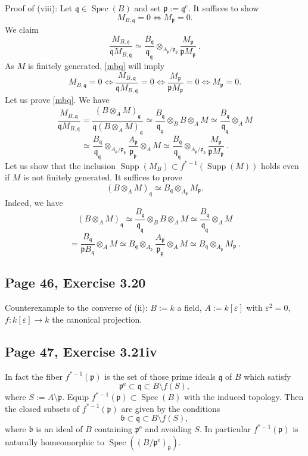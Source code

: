 \documentclass[parskip=half,fontsize=12pt]{scrartcl}%
\newcommand{\oo}{\operatorname}\newcommand{\ooo}{\operatorname*}
\newcommand{\mf}{\mathfrak}
\newcommand{\bbb}{\mf b}
\newcommand{\ppp}{\mf p}
\newcommand{\qqq}{\mf q}
\newcommand{\Spec}{\operatorname{Spec}}\newcommand{\Sp}{\operatorname{Spec}}
\begin{document}
Proof of (viii): Let $\qqq\in\Spec(B)$ and set $\ppp:=\qqq^{\oo c}$. It suffices to show 
$$
M_{B,\qqq}=0\iff M_\ppp=0.
$$ 
We claim
\begin{equation}\label{mbq}
\frac{M_{B,\qqq}}{\qqq M_{B,\qqq}}\simeq\frac{B_\qqq}{\qqq_\qqq}\otimes_{A_\ppp/\ppp_\ppp}\frac{M_\ppp}{\ppp M_\ppp}\ .
\end{equation}
As $M$ is finitely generated, \eqref{mbq} will imply 
$$
M_{B,\qqq}=0\iff\frac{M_{B,\qqq}}{\qqq M_{B,\qqq}}=0\iff\frac{M_\ppp}{\ppp M_\ppp}=0\iff M_\ppp=0.
$$ 
Let us prove \eqref{mbq}. We have 
$$
\frac{M_{B,\qqq}}{\qqq M_{B,\qqq}}=
\frac{(B\otimes_AM)_\qqq}{\qqq(B\otimes_AM)_\qqq}\simeq
\frac{B_\qqq}{\qqq_\qqq}\otimes_BB\otimes_AM\simeq
\frac{B_\qqq}{\qqq_\qqq}\otimes_AM
$$ 
$$
\simeq
\frac{B_\qqq}{\qqq_\qqq}\otimes_{A_\ppp/\ppp_\ppp}\frac{A_\ppp}{\ppp_\ppp}\otimes_AM\simeq
\frac{B_\qqq}{\qqq_\qqq}\otimes_{A_\ppp/\ppp_\ppp}\frac{M_\ppp}{\ppp M_\ppp}\ .
$$ 
Let us show that the inclusion $\oo{Supp}(M_B)\subset f^{*-1}(\oo{Supp}(M))$ holds even if $M$ is not finitely generated. It suffices to prove 
$$%
(B\otimes_AM)_\qqq\simeq B_\qqq\otimes_{A_\ppp}M_\ppp.
$$%
Indeed, we have 
$$
(B\otimes_AM)_\qqq\simeq\frac{B_\qqq}{\qqq_\qqq}\otimes_BB\otimes_AM\simeq
\frac{B_\qqq}{\qqq_\qqq}\otimes_AM
$$ 
$$
=\frac{B_\qqq}{\ppp B_\qqq}\otimes_AM\simeq 
B_\qqq\otimes_{A_\ppp}\frac{A_\ppp}{\ppp_\ppp}\otimes_AM\simeq 
B_\qqq\otimes_{A_\ppp}M_\ppp\ .
$$

\subsection{Page 46, Exercise 3.20}%

Counterexample to the converse of (ii): $B:=k$ a field, $A:=k[\varepsilon]$ with $\varepsilon^2=0$, $f:k[\varepsilon]\to k$ the canonical projection. 

\subsection{Page 47, Exercise 3.21iv}\label{321iv}%

In fact the fiber $f^{*-1}(\ppp)$ is the set of those prime ideals $\qqq$ of $B$ which satisfy 
$$
\ppp^{\oo{e}}\subset\qqq\subset B\setminus f(S),
$$ 
where $S:=A\setminus\ppp$. Equip $f^{*-1}(\ppp)\subset\Spec(B)$ with the induced topology. Then the closed subsets of $f^{*-1}(\ppp)$ are given by the conditions 
$$
\bbb\subset\qqq\subset B\setminus f(S),
$$ 
where $\bbb$ is an ideal of $B$ containing $\ppp^{\oo{e}}$ and avoiding $S$. In particular $f^{*-1}(\ppp)$ is naturally homeomorphic to $\Spec((B/\ppp^{\oo{e}})_\ppp)$.
\end{document}

